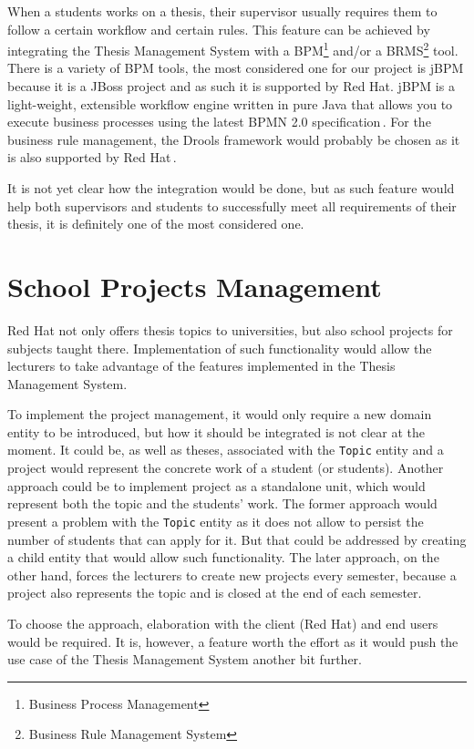 When a students works on a thesis, their supervisor usually requires them to follow a certain workflow and certain rules. This feature can be achieved by integrating the Thesis Management System with a BPM\footnote{Business Process Management} and/or a BRMS\footnote{Business Rule Management System} tool. There is a variety of BPM tools, the most considered one for our project is jBPM because it is a JBoss project and as such it is supported by Red Hat. jBPM is a light-weight, extensible workflow engine written in pure Java that allows you to execute business processes using the latest BPMN 2.0 specification\,\cite{jbpm-homepage}. For the business rule management, the Drools framework would probably be chosen as it is also supported by Red Hat\,\cite{drools-homepage}. 

It is not yet clear how the integration would be done, but as such feature would help both supervisors and students to successfully meet all requirements of their thesis, it is definitely one of the most considered one.

\section{School Projects Management}

Red Hat not only offers thesis topics to universities, but also school projects for subjects taught there. Implementation of such functionality would allow the lecturers to take advantage of the features implemented in the Thesis Management System.

To implement the project management, it would only require a new domain entity to be introduced, but how it should be integrated is not clear at the moment. It could be, as well as theses, associated with the \texttt{Topic} entity and a project would represent the concrete work of a student (or students). Another approach could be to implement project as a standalone unit, which would represent both the topic and the students' work. The former approach would present a problem with the \texttt{Topic} entity as it does not allow to persist the number of students that can apply for it. But that could be addressed by creating a child entity that would allow such functionality. The later approach, on the other hand, forces the lecturers to create new projects every semester, because a project also represents the topic and is closed at the end of each semester.

To choose the approach, elaboration with the client (Red Hat) and end users would be required. It is, however, a feature worth the effort as it would push the use case of the Thesis Management System another bit further.


